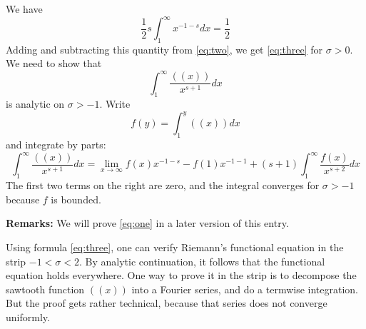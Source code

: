 \documentclass[12pt]{article}
\begin{document}
We have
\begin{equation*}
\frac{1}{2}s\int_1^\infty x^{-1-s}dx=\frac{1}{2}
\end{equation*}
Adding and subtracting this quantity from \eqref{eq:two},
we get \eqref{eq:three} for $\sigma>0$.
We need to show that
$$\int_1^\infty \frac{((x))}{x^{s+1}}dx$$
is analytic on $\sigma>-1$. Write
$$f(y)=\int_1^y ((x))dx$$
and integrate by parts:
$$\int_1^\infty \frac{((x))}{x^{s+1}}dx
=\lim_{x\to\infty}f(x)x^{-1-s} - f(1)x^{-1-1}+(s+1)
\int_1^\infty\frac{f(x)}{x^{s+2}}dx
$$
The first two terms on the right are zero, and the integral
converges for $\sigma>-1$ because $f$ is bounded.

\textbf{Remarks:}
We will prove \eqref{eq:one} in a later version of this entry.

Using formula \eqref{eq:three}, one can verify Riemann's
functional equation in the strip $-1<\sigma<2$.
By analytic continuation, it follows that the functional
equation holds everywhere.
One way to prove it in the strip is to decompose the
sawtooth function $((x))$ into a Fourier series, and
do a termwise integration.
But the proof gets rather technical, because that
series does not converge uniformly.
\end{document}
